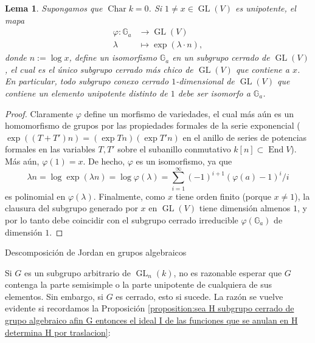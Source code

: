 \documentclass[spanish,10pt]{amsart}
\makeatletter
\renewcommand\subsection{\@startsection{subsection}{2}%
  \z@{.5\linespacing\@plus.7\linespacing}{-.5em}%
  {\normalfont\sffamily}}
\newtheorem{lemma}[theorem]{Lema}
\theoremstyle{definition}
\theoremstyle{remark}
\numberwithin{equation}{section}
\newcommand{\Char}[1]{\operatorname{Char} #1}
\makeatother
\begin{document}
\begin{lemma}
Supongamos que $\Char k = 0$. Si $1 \neq x \in \operatorname{GL} (V)$ es unipotente, el mapa
\begin{align*}
\varphi : \mathbb{G}_a &\longrightarrow \operatorname{GL} (V) \\
\lambda &\longmapsto \exp (\lambda \cdot n),
\end{align*}
donde $n := \log x$, define un isomorfismo $ \mathbb{G}_a$ en un subgrupo cerrado de $\operatorname{GL} (V)$, el cual es el único subgrupo cerrado más chico de $\operatorname{GL}(V)$ que contiene a $x$. En particular, todo subgrupo conexo cerrado $1$-dimensional de $\operatorname{GL} (V)$ que contiene un elemento unipotente distinto de $1$ debe ser isomorfo a $\mathbb{G}_a$.
\end{lemma}
\begin{proof}
Claramente $\varphi$ define un morfismo de variedades, el cual más aún es un homomorfismo de grupos por las propiedades formales de la serie exponencial ($\exp ((T+T')n) = (\exp T n) (\exp T' n)$ en el anillo de series de potencias formales en las variables $T,T'$ sobre el subanillo conmutativo $k[n] \subset \operatorname{End} V$). Más aún, $\varphi (1) = x$. De hecho, $\varphi$ es un isomorfismo, ya que
\[
    \lambda n = \log \exp (\lambda n) = \log \varphi (\lambda) = \sum_{i = 1}^\infty (-1)^{i+1} (\varphi (a)- 1)^i / i
\]
es polinomial en $\varphi (\lambda)$. Finalmente, como $x$ tiene orden finito (porque $x \neq 1$), la clausura del subgrupo generado por $x$ en $\operatorname{GL} (V)$ tiene dimensión almenos $1$, y por lo tanto debe coincidir con el subgrupo cerrado irreducible $\varphi (\mathbb{G}_a)$ de dimensión $1$.
\end{proof}



\subsection{Descomposición de Jordan en grupos algebraicos}

Si $G$ es un subgrupo arbitrario de $\operatorname{GL}_n (k)$, no es razonable esperar que $G$ contenga la parte semisimple o la parte unipotente de cualquiera de sus elementos. Sin embargo, si $G$ es cerrado, esto si sucede. La razón se vuelve evidente si recordamos la Proposición \ref{proposition:sea H subgrupo cerrado de grupo algebraico afin G entonces el ideal I de las funciones que se anulan en H determina H por traslacion}:
\end{document}
